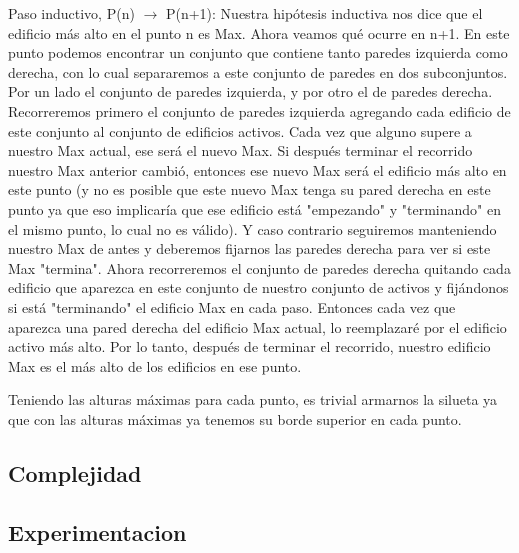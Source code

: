 Paso inductivo, P(n) $\rightarrow$ P(n+1):
Nuestra hipótesis inductiva nos dice que el edificio más alto en el punto n es Max. Ahora veamos qué ocurre en n+1. En este punto podemos encontrar un conjunto que contiene tanto paredes izquierda como derecha, con lo cual separaremos a este conjunto de paredes en dos subconjuntos. Por un lado el conjunto de paredes izquierda, y por otro el de paredes derecha. Recorreremos primero el conjunto de paredes izquierda agregando cada edificio de este conjunto al conjunto de edificios activos. Cada vez que alguno supere a nuestro Max actual, ese será el nuevo Max. Si después terminar el recorrido nuestro Max anterior cambió, entonces ese nuevo Max será el edificio más alto en este punto (y no es posible que este nuevo Max tenga su pared derecha en este punto ya que eso implicaría que ese edificio está "empezando" y "terminando" en el mismo punto, lo cual no es válido). Y caso contrario seguiremos manteniendo nuestro Max de antes y deberemos fijarnos las paredes derecha para ver si este Max "termina".
Ahora recorreremos el conjunto de paredes derecha quitando cada edificio que aparezca en este conjunto de nuestro conjunto de activos y fijándonos si está "terminando" el edificio Max en cada paso. Entonces cada vez que aparezca una pared derecha del edificio Max actual, lo reemplazaré por el edificio activo más alto. Por lo tanto, después de terminar el recorrido, nuestro edificio Max es el más alto de los edificios en ese punto.

Teniendo las alturas máximas para cada punto, es trivial armarnos la silueta ya que con las alturas máximas ya tenemos su borde superior en cada punto.


\subsection{Complejidad}

\subsection{Experimentacion}

  



